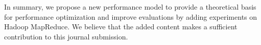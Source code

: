 \documentclass[12pt,reqno]{amsart}
\theoremstyle{plain}
\numberwithin{equation}{section}
\theoremstyle{plain}
\numberwithin{equation}{section}
\begin{document}
In summary, we propose a new performance model to provide a theoretical basis for performance optimization and improve evaluations by adding experiments on Hadoop MapReduce. 
We believe that the added content makes a sufficient contribution to this journal submission.



\end{document}
